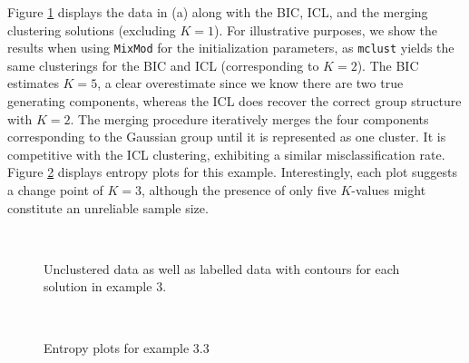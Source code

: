 \documentclass{uwstat572}
\renewcommand\;{\,}
\begin{document}
Figure \ref{Example3} displays the data in (a) along with the BIC, ICL, and the merging clustering solutions (excluding $K = 1$).
For illustrative purposes, we show the results when using \texttt{MixMod} for the initialization parameters, as \texttt{mclust} yields the same clusterings for the BIC and ICL (corresponding to $K = 2$).
The BIC estimates $K = 5$, a clear overestimate since we know there are two true generating components, whereas the ICL does recover the correct group structure with $K = 2$.
The merging procedure iteratively merges the four components corresponding to the Gaussian group until it is represented as one cluster.
It is competitive with the ICL clustering, exhibiting a similar misclassification rate. 
Figure \ref{Entropy3} displays entropy plots for this example.
Interestingly, each plot suggests a change point of $K = 3$, although the presence of only five $K$-values might constitute an unreliable sample size.

  
\begin{figure}
\begin{center}
\\ \vspace{-1em}
\end{center}
\caption{Unclustered data as well as labelled data with contours for each solution in example 3.}
\label{Example3}
\end{figure}

\begin{figure}
\begin{center}
\\ \vspace{-1em}
\end{center}
\caption{Entropy plots for example 3.3}
\label{Entropy3}
\end{figure}
\end{document}
